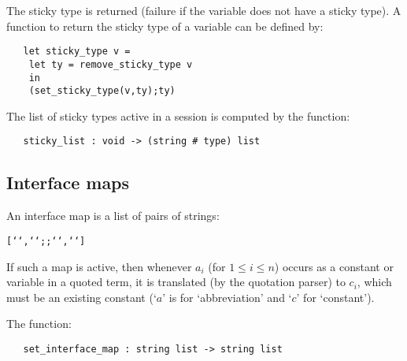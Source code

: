 {{\noindent The sticky type is returned (failure if the variable does not 
have a sticky type). A function to return the sticky type of a variable
can be defined by:

\begin{hol}\begin{verbatim}
   let sticky_type v =
    let ty = remove_sticky_type v
    in
    (set_sticky_type(v,ty);ty)
\end{verbatim}\end{hol}

\noindent The list of sticky types active in a session is computed by the 
function:

\begin{boxed}
\begin{verbatim}
   sticky_list : void -> (string # type) list
\end{verbatim}\end{boxed}

\subsection{Interface maps}

An interface map is a list of pairs of strings:

\begin{hol}\begin{alltt}
   [``,``; \m{\ldots} ;``,``]
\end{alltt}\end{hol}


If such a map is active, then whenever $a_i$ (for $1\leq i \leq n$) occurs as a
constant or  variable  in  a quoted  term, it  is translated  (by the quotation
parser) to  $c_i$,  which  must  be  an  existing constant  (`$a$' is for
`abbreviation' and `$c$' for `constant').

The function:

\begin{boxed}
\begin{verbatim}
   set_interface_map : string list -> string list
\end{verbatim}\end{boxed}

}}
